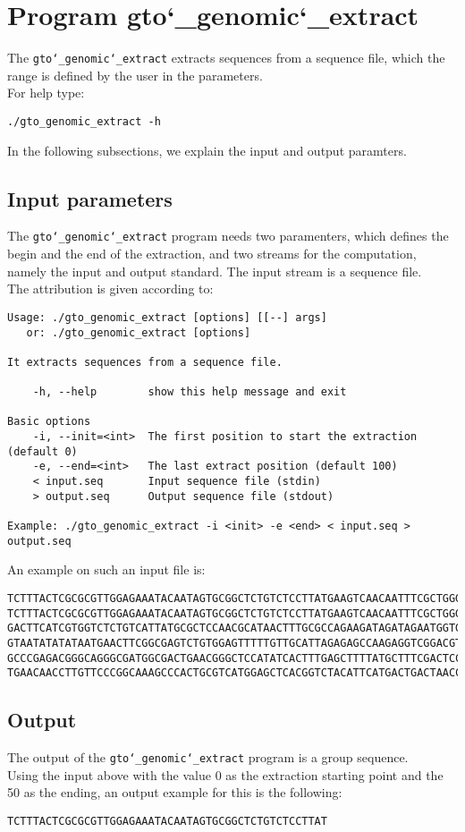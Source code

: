 \section{Program gto\char`_genomic\char`_extract}
The \texttt{gto\char`_genomic\char`_extract} extracts sequences from a sequence file, which the range is defined by the user in the parameters.\\
For help type:
\begin{lstlisting}
./gto_genomic_extract -h
\end{lstlisting}
In the following subsections, we explain the input and output paramters.

\subsection*{Input parameters}

The \texttt{gto\char`_genomic\char`_extract} program needs two paramenters, which defines the begin and the end of the extraction, and two streams for the computation, namely the input and output standard. The input stream is a sequence file.\\
The attribution is given according to:
\begin{lstlisting}
Usage: ./gto_genomic_extract [options] [[--] args]
   or: ./gto_genomic_extract [options]

It extracts sequences from a sequence file.

    -h, --help        show this help message and exit

Basic options
    -i, --init=<int>  The first position to start the extraction (default 0)
    -e, --end=<int>   The last extract position (default 100)
    < input.seq       Input sequence file (stdin)
    > output.seq      Output sequence file (stdout)

Example: ./gto_genomic_extract -i <init> -e <end> < input.seq > output.seq
\end{lstlisting}
An example on such an input file is:
\begin{lstlisting}
TCTTTACTCGCGCGTTGGAGAAATACAATAGTGCGGCTCTGTCTCCTTATGAAGTCAACAATTTCGCTGGGACTTGCGGC
TCTTTACTCGCGCGTTGGAGAAATACAATAGTGCGGCTCTGTCTCCTTATGAAGTCAACAATTTCGCTGGGACTTGCGGC
GACTTCATCGTGGTCTCTGTCATTATGCGCTCCAACGCATAACTTTGCGCCAGAAGATAGATAGAATGGTGTAAGAAACT
GTAATATATATAATGAACTTCGGCGAGTCTGTGGAGTTTTTGTTGCATTAGAGAGCCAAGAGGTCGGACGTCCTCACGTA
GCCCGAGACGGGCAGGGCGATGGCGACTGAACGGGCTCCATATCACTTTGAGCTTTTATGCTTTCGACTCCTCCAGGAGC
TGAACAACCTTGTTCCCGGCAAAGCCCACTGCGTCATGGAGCTCACGGTCTACATTCATGACTGACTAACCGTAAACTGC
\end{lstlisting}

\subsection*{Output}
The output of the \texttt{gto\char`_genomic\char`_extract} program is a group sequence.\\
Using the input above with the value 0 as the extraction starting point and the 50 as the ending, an output example for this is the following:
\begin{lstlisting}
TCTTTACTCGCGCGTTGGAGAAATACAATAGTGCGGCTCTGTCTCCTTAT
\end{lstlisting}